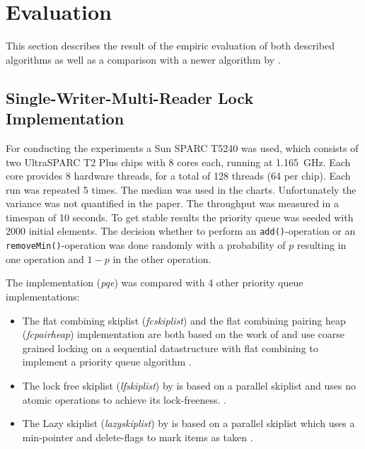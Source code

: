 
\section{Evaluation}

This section describes the result of the empiric evaluation of both described algorithms as well as a comparison with a newer algorithm by \citeauthor{braginsky_cbpq:_2016}.

\subsection{Single-Writer-Multi-Reader Lock Implementation}

For conducting the experiments a Sun SPARC T5240 was used, which consists of two UltraSPARC T2 Plus chips with 8 cores each, running at 1.165~GHz. Each core provides 8 hardware threads, for a total of 128 threads (64 per chip). Each run was repeated 5 times. The median was used in the charts. Unfortunately the variance was not quantified in the paper. The throughput was measured in a timespan of 10 seconds. To get stable results the priority queue was seeded with 2000 initial elements. The decision whether to perform an \texttt{add()}-operation or an \texttt{removeMin()}-operation was done randomly with a probability of $p$ resulting in one operation and $1-p$ in the other operation.

The implementation (\textit{pqe}) was compared with 4 other priority queue implementations:
\begin{itemize}
	\item The flat combining skiplist (\textit{fcskiplist}) and the flat combining pairing heap (\textit{fcpairheap}) implementation are both based on the work of \citeauthor{hendler_flat_2010} and use coarse grained locking on a sequential datastructure with flat combining to implement a priority queue algorithm \cite{hendler_flat_2010}.
	\item The lock free skiplist (\textit{lfskiplist}) by \citeauthor{sundell_fast_2003} is based on a parallel skiplist and uses no atomic operations to achieve its lock-freeness. \cite{sundell_fast_2003}.
	\item The Lazy skiplist (\textit{lazyskiplist}) by \citeauthor{lotan_skiplist-based_2000} is based on a parallel skiplist which uses a min-pointer and delete-flags to mark items as taken \cite{lotan_skiplist-based_2000}.
\end{itemize}

